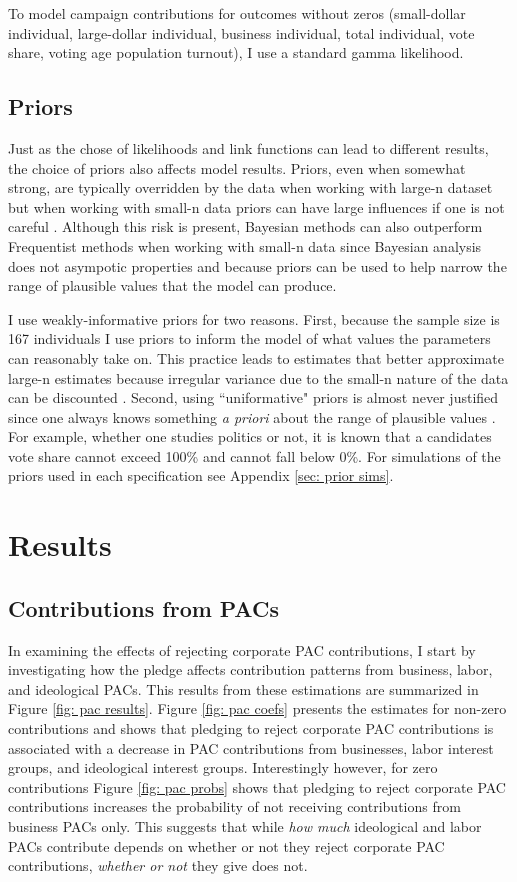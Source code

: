 \documentclass[12pt]{article}
\begin{document}
To model campaign contributions for outcomes without zeros (small-dollar individual, large-dollar individual, business individual, total individual, vote share, voting age population turnout), I use a standard gamma likelihood.

\subsection{Priors}

Just as the chose of likelihoods and link functions can lead to different results, the choice of priors also affects model results. Priors, even when somewhat strong, are typically overridden by the data when working with large-n dataset but when working with small-n data priors can have large influences if one is not careful \citep{mcneish2016}. Although this risk is present, Bayesian methods can also outperform Frequentist methods when working with small-n data since Bayesian analysis does not asympotic properties and because priors can be used to help narrow the range of plausible values that the model can produce. 

I use weakly-informative priors for two reasons. First, because the sample size is 167 individuals I use priors to inform the model of what values the parameters can reasonably take on. This practice leads to estimates that better approximate large-n estimates because irregular variance due to the small-n nature of the data can be discounted \citep{mcneish2016}. Second, using ``uniformative" priors is almost never justified since one always knows something \textit{a priori} about the range of plausible values \citep{gelman2008a}. For example, whether one studies politics or not, it is known that a candidates vote share cannot exceed 100\% and cannot fall below 0\%. For simulations of the priors used in each specification see Appendix \ref{sec: prior sims}.


\section{Results}

\subsection{Contributions from PACs}

In examining the effects of rejecting corporate PAC contributions, I start by investigating how the pledge affects contribution patterns from business, labor, and ideological PACs. This results from these estimations are summarized in Figure \ref{fig: pac results}. Figure \ref{fig: pac coefs} presents the estimates for non-zero contributions and shows that pledging to reject corporate PAC contributions is associated with a decrease in PAC contributions from businesses, labor interest groups, and ideological interest groups. Interestingly however, for zero contributions Figure \ref{fig: pac probs} shows that pledging to reject corporate PAC contributions increases the probability of not receiving contributions from business PACs only. This suggests that while \emph{how much} ideological and labor PACs contribute depends on whether or not they reject corporate PAC contributions, \emph{whether or not} they give does not. 
\end{document}
